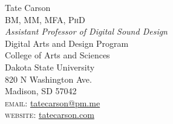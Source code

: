 \documentclass[10pt, a4paper]{article}
\begin{document}
{\Huge Tate Carson}\\[0.1cm]
\textsc{BM, MM, MFA, PhD}\\[0.9cm]
\emph{Assistant Professor of Digital Sound Design}\\
Digital Arts and Design Program \\
College of Arts and Sciences\\
Dakota State University \\ 
820 N Washington Ave.\\
Madison, SD 57042 \\[.2cm]

\textsc{email}: \href{mailto:tatecarson@pm.me}{tatecarson@pm.me}\\
\textsc{website}: \href{https://tatecarson.com}{tatecarson.com}


\end{document}
